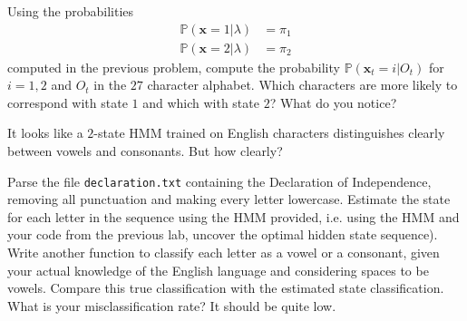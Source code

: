 \begin{problem}
Using the probabilities 
\begin{align*}
\mathbb{P}(\mathbf{x} = 1 | \lambda) & = \pi_{1} \\
\mathbb{P}(\mathbf{x} = 2 | \lambda) & = \pi_{2}
\end{align*}
computed in the previous problem, compute the probability $\mathbb{P}(\mathbf{x}_{t} = i | O_{t})$ for $i = 1,2$ and $O_{t}$ in the $27$ character alphabet. Which characters are more likely to correspond with state $1$ and which with state $2$? What do you notice?
\end{problem}
It looks like a $2$-state HMM trained on English characters distinguishes clearly between vowels and consonants. But how clearly?

\begin{problem}
Parse the file \texttt{declaration.txt} containing the Declaration of Independence, removing all punctuation and making every letter lowercase. Estimate the state for each letter in the sequence using the HMM provided, i.e. using the HMM and your code from the previous lab, uncover the optimal hidden state sequence). Write another function to classify each letter as a vowel or a consonant, given your actual knowledge of the English language and considering spaces to be vowels. Compare this true classification with the estimated state classification. What is your misclassification rate? It should be quite low.
\end{problem}
